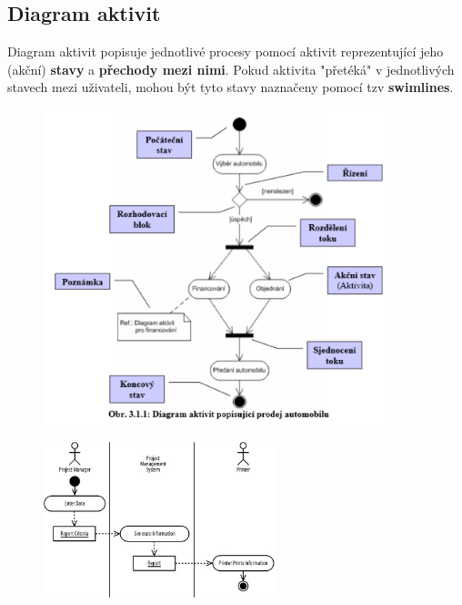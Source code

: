 \subsection{Diagram aktivit}
Diagram aktivit popisuje jednotlivé procesy pomocí aktivit reprezentující jeho (akční) \textbf{stavy} a \textbf{přechody mezi nimi}. Pokud aktivita "přetéká" v jednotlivých stavech mezi uživateli, mohou být tyto stavy naznačeny pomocí tzv \textbf{swimlines}.
\begin{figure}[H]
    \centering
    \includegraphics[width=0.9\textwidth]{assets/diag_aktivit.png}
\end{figure}

\begin{figure}[H]
	\centering
	\includegraphics[width=0.6\textwidth]{assets/diag_aktivit_swimlines}
\end{figure}